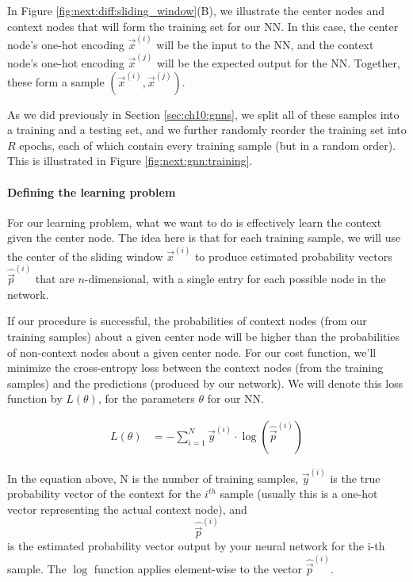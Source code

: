 In Figure \ref{fig:next:diff:sliding_window}(B), we illustrate the center nodes and context nodes that will form the training set for our NN. In this case, the center node's one-hot encoding $\vec x^{(i)}$ will be the input to the NN, and the context node's one-hot encoding $\vec x^{(j)}$ will be the expected output for the NN. Together, these form a sample $\left(\vec x^{(i)}, \vec x^{(j)}\right)$.

As we did previously in Section \ref{sec:ch10:gnns}, we split all of these samples into a training and a testing set, and we further randomly reorder the training set into $R$ epochs, each of which contain every training sample (but in a random order). This is illustrated in Figure \ref{fig:next:gnn:training}.

\paragraph*{Defining the learning problem}

For our learning problem, what we want to do is effectively learn the context given the center node. The idea here is that for each training sample, we will use the center of the sliding window $\vec x^{(i)}$ to produce estimated probability vectors $\hat{\vec p}^{(i)}$ that are $n$-dimensional, with a single entry for each possible node in the network. 

If our procedure is successful, the probabilities of context nodes (from our training samples) about a given center node will be higher than the probabilities of non-context nodes about a given center node. For our cost function, we'll minimize the cross-entropy loss between the context nodes (from the training samples) and the predictions (produced by our network). We will denote this loss function by $L(\theta)$, for the parameters $\theta$ for our NN. 

\begin{align*}
    L(\theta) &= -\sum_{i=1}^{N}\vec y^{(i)} \cdot \log(\hat{\vec p}^{(i)})
\end{align*}

In the equation above, N is the number of training samples, $\vec y^{(i)}$ is the true probability vector of the context for the $i^{th}$ sample (usually this is a one-hot vector representing the actual context node), and $$\hat{\vec p}^{(i)}$$ is the estimated probability vector output by your neural network for the i-th sample. The $\log$ function applies element-wise to the vector $\hat{\vec p}^{(i)}.$

